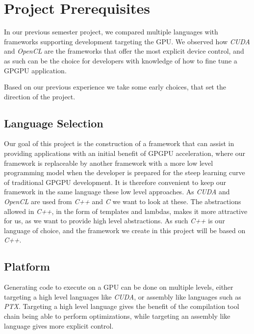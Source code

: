 \section{Project Prerequisites}
In our previous semester project\cite{sw9Report}, we compared multiple languages with frameworks supporting development targeting the GPU. We observed how \textit{CUDA} and \textit{OpenCL} are the frameworks that offer the most explicit device control, and as such can be the choice for developers with knowledge of how to fine tune a GPGPU application.

Based on our previous experience we take some early choices, that set the direction of the project.

\subsection{Language Selection}\label{cha:languageSelection}
Our goal of this project is the construction of a framework that can assist in providing applications with an initial benefit of GPGPU acceleration, where our framework is replaceable by another framework with a more low level programming model when the developer is prepared for the steep learning curve of traditional GPGPU development. It is therefore convenient to keep our framework in the same language these low level approaches. As \textit{CUDA} and \textit{OpenCL} are used from \textit{C++} and \textit{C} we want to look at these. The abstractions allowed in \textit{C++}, in the form of templates and lambdas, makes it more attractive for us, as we want to provide high level abstractions. As such \textit{C++} is our language of choice, and the framework we create in this project will be based on \textit{C++}.

\subsection{Platform}
Generating code to execute on a GPU can be done on multiple levels, either targeting a high level languages like \textit{CUDA}, or assembly like languages such as \textit{PTX}. Targeting a high level language gives the benefit of the compilation tool chain being able to perform optimizations, while targeting an assembly like language gives more explicit control.

